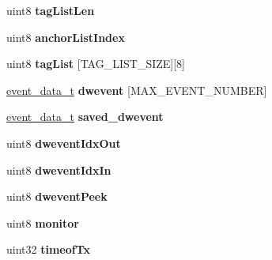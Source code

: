 \begin{DoxyCompactItemize}
{\item 
\hypertarget{structinstance__data__t_a09907eede4b4be10931e4e0791255b5f}{uint8 {\bfseries tag\-List\-Len}}\label{structinstance__data__t_a09907eede4b4be10931e4e0791255b5f}

\item 
\hypertarget{structinstance__data__t_a6d6bbf65f04392397c27d60f4b92b79e}{uint8 {\bfseries anchor\-List\-Index}}\label{structinstance__data__t_a6d6bbf65f04392397c27d60f4b92b79e}

\item 
\hypertarget{structinstance__data__t_a1ad154f941604d15ec76650885767e3b}{uint8 {\bfseries tag\-List} \mbox{[}T\-A\-G\-\_\-\-L\-I\-S\-T\-\_\-\-S\-I\-Z\-E\mbox{]}\mbox{[}8\mbox{]}}\label{structinstance__data__t_a1ad154f941604d15ec76650885767e3b}

\item 
\hypertarget{structinstance__data__t_a1ee31ceb43d8de95a6b660984139ca6a}{\hyperlink{structevent__data__t}{event\-\_\-data\-\_\-t} {\bfseries dwevent} \mbox{[}M\-A\-X\-\_\-\-E\-V\-E\-N\-T\-\_\-\-N\-U\-M\-B\-E\-R\mbox{]}}\label{structinstance__data__t_a1ee31ceb43d8de95a6b660984139ca6a}

\item 
\hypertarget{structinstance__data__t_a422331c6c6971135aa096f71f420b2d1}{\hyperlink{structevent__data__t}{event\-\_\-data\-\_\-t} {\bfseries saved\-\_\-dwevent}}\label{structinstance__data__t_a422331c6c6971135aa096f71f420b2d1}

\item 
\hypertarget{structinstance__data__t_ac5ca50a0a22c1254f9e1f279fc0b1c53}{uint8 {\bfseries dwevent\-Idx\-Out}}\label{structinstance__data__t_ac5ca50a0a22c1254f9e1f279fc0b1c53}

\item 
\hypertarget{structinstance__data__t_a7357e7b38a4efd77372346af60ed97f3}{uint8 {\bfseries dwevent\-Idx\-In}}\label{structinstance__data__t_a7357e7b38a4efd77372346af60ed97f3}

\item 
\hypertarget{structinstance__data__t_acaa253d54ff4e88187358a385c1bcf7f}{uint8 {\bfseries dwevent\-Peek}}\label{structinstance__data__t_acaa253d54ff4e88187358a385c1bcf7f}

\item 
\hypertarget{structinstance__data__t_a22573ecc0f3603a442ed8e776f32ea08}{uint8 {\bfseries monitor}}\label{structinstance__data__t_a22573ecc0f3603a442ed8e776f32ea08}

\item 
\hypertarget{structinstance__data__t_af6ff473078a30e67a183c9d247e4b3b9}{uint32 {\bfseries timeof\-Tx}}\label{structinstance__data__t_af6ff473078a30e67a183c9d247e4b3b9}

}
\end{DoxyCompactItemize}
